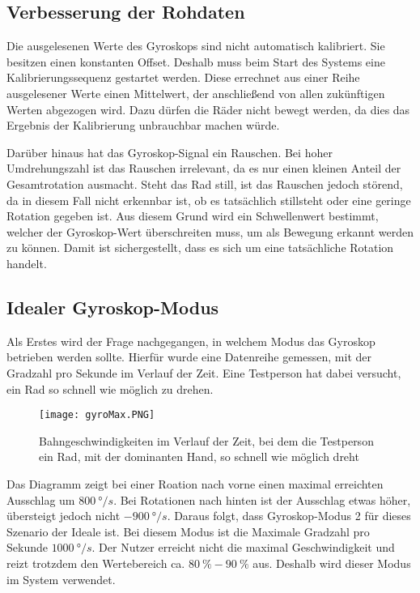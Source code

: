 \subsection{Verbesserung der Rohdaten}
Die ausgelesenen Werte des Gyroskops sind nicht automatisch kalibriert.
Sie besitzen einen konstanten Offset. Deshalb muss beim Start des Systems eine Kalibrierungssequenz gestartet werden.
Diese errechnet aus einer Reihe ausgelesener Werte einen Mittelwert, der anschließend von allen zukünftigen Werten abgezogen wird.
Dazu dürfen die Räder nicht bewegt werden, da dies das Ergebnis der Kalibrierung unbrauchbar machen würde.

Darüber hinaus hat das Gyroskop-Signal ein Rauschen.
Bei hoher Umdrehungszahl ist das Rauschen irrelevant, da es nur einen kleinen Anteil der Gesamtrotation ausmacht.
Steht das Rad still, ist das Rauschen jedoch störend, da in diesem Fall nicht erkennbar ist, ob es tatsächlich stillsteht oder eine geringe Rotation gegeben ist.
Aus diesem Grund wird ein Schwellenwert bestimmt, welcher der Gyroskop-Wert überschreiten muss, um als Bewegung erkannt werden zu können.
Damit ist sichergestellt, dass es sich um eine tatsächliche Rotation handelt.

\subsection{Idealer Gyroskop-Modus}
Als Erstes wird der Frage nachgegangen, in welchem Modus das Gyroskop betrieben werden sollte.
Hierfür wurde eine Datenreihe gemessen, mit der Gradzahl pro Sekunde im Verlauf der Zeit.
Eine Testperson hat dabei versucht, ein Rad so schnell wie möglich zu drehen.

\begin{figure}[h]
    \texttt{[image: gyroMax.PNG]}
    \caption{Bahngeschwindigkeiten im Verlauf der Zeit, bei dem die Testperson ein Rad, mit der dominanten Hand, so schnell wie möglich dreht}
\end{figure}

Das Diagramm zeigt bei einer Roation nach vorne einen maximal erreichten Ausschlag um $800\ \si{\degree}/s$.
Bei Rotationen nach hinten ist der Ausschlag etwas höher, übersteigt jedoch nicht $-900\ \si{\degree}/s$.
Daraus folgt, dass Gyroskop-Modus 2 für dieses Szenario der Ideale ist.
Bei diesem Modus ist die Maximale Gradzahl pro Sekunde $1000\ \si{\degree}/s$.
Der Nutzer erreicht nicht die maximal Geschwindigkeit und reizt trotzdem den Wertebereich ca. $80\ \%-90\ \%$ aus. Deshalb wird dieser Modus im System verwendet.

